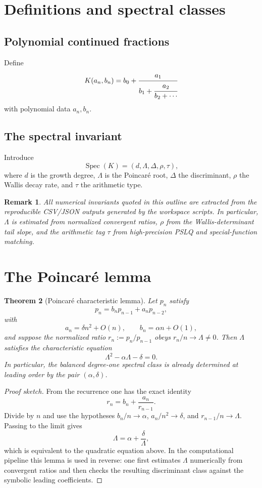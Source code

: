 \documentclass[11pt]{article}
\newtheorem{theorem}{Theorem}[section]
\newtheorem{remark}[theorem]{Remark}
\begin{document}
\section{Definitions and spectral classes}
\subsection{Polynomial continued fractions}
Define
\[
K(a_n,b_n) = b_0 + \cfrac{a_1}{b_1 + \cfrac{a_2}{b_2 + \cdots}}
\]
with polynomial data $a_n,b_n$.

\subsection{The spectral invariant}
Introduce
\[
\operatorname{Spec}(K)=(d,\Lambda,\Delta,\rho,\tau),
\]
where $d$ is the growth degree, $\Lambda$ is the Poincar\'e root, $\Delta$ the discriminant, $\rho$ the Wallis decay rate, and $\tau$ the arithmetic type.

\begin{remark}
All numerical invariants quoted in this outline are extracted from the reproducible CSV/JSON outputs generated by the workspace scripts. In particular, $\Lambda$ is estimated from normalized convergent ratios, $\rho$ from the Wallis-determinant tail slope, and the arithmetic tag $\tau$ from high-precision PSLQ and special-function matching.
\end{remark}

\section{The Poincar\'e lemma}
\begin{theorem}[Poincar\'e characteristic lemma]\label{thm:poincare-outline}
Let $p_n$ satisfy
\[
  p_n=b_n p_{n-1}+a_n p_{n-2},
\]
with
\[
  a_n = \delta n^2 + O(n), \qquad b_n = \alpha n + O(1),
\]
and suppose the normalized ratio $r_n:=p_n/p_{n-1}$ obeys $r_n/n\to\Lambda\neq 0$. Then $\Lambda$ satisfies the characteristic equation
\[
  \Lambda^2 - \alpha \Lambda - \delta = 0.
\]
In particular, the balanced degree-one spectral class is already determined at leading order by the pair $(\alpha,\delta)$.
\end{theorem}

\begin{proof}[Proof sketch]
From the recurrence one has the exact identity
\[
  r_n = b_n + \frac{a_n}{r_{n-1}}.
\]
Divide by $n$ and use the hypotheses $b_n/n \to \alpha$, $a_n/n^2 \to \delta$, and $r_{n-1}/n \to \Lambda$. Passing to the limit gives
\[
  \Lambda = \alpha + \frac{\delta}{\Lambda},
\]
which is equivalent to the quadratic equation above. In the computational pipeline this lemma is used in reverse: one first estimates $\Lambda$ numerically from convergent ratios and then checks the resulting discriminant class against the symbolic leading coefficients.
\end{proof}
\end{document}
